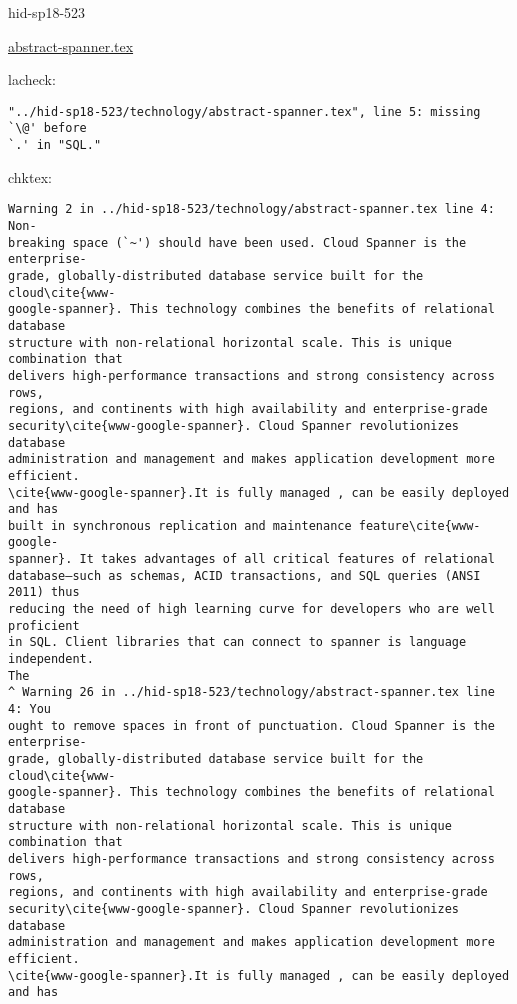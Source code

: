 \begin{IU}

hid-sp18-523

\href{https://github.com/cloudmesh-community/hid-sp18-523/blob/master//technology/abstract-spanner.tex}{abstract-spanner.tex}

 
lacheck:
\begin{tiny}
\begin{verbatim}
"../hid-sp18-523/technology/abstract-spanner.tex", line 5: missing `\@' before
`.' in "SQL."
\end{verbatim}
\end{tiny}
chktex:
\begin{tiny}
\begin{verbatim}
Warning 2 in ../hid-sp18-523/technology/abstract-spanner.tex line 4: Non-
breaking space (`~') should have been used. Cloud Spanner is the enterprise-
grade, globally-distributed database service built for the cloud\cite{www-
google-spanner}. This technology combines the benefits of relational database
structure with non-relational horizontal scale. This is unique combination that
delivers high-performance transactions and strong consistency across rows,
regions, and continents with high availability and enterprise-grade
security\cite{www-google-spanner}. Cloud Spanner revolutionizes database
administration and management and makes application development more efficient.
\cite{www-google-spanner}.It is fully managed , can be easily deployed and has
built in synchronous replication and maintenance feature\cite{www-google-
spanner}. It takes advantages of all critical features of relational
database—such as schemas, ACID transactions, and SQL queries (ANSI 2011) thus
reducing the need of high learning curve for developers who are well proficient
in SQL. Client libraries that can connect to spanner is language independent.
The
^ Warning 26 in ../hid-sp18-523/technology/abstract-spanner.tex line 4: You
ought to remove spaces in front of punctuation. Cloud Spanner is the enterprise-
grade, globally-distributed database service built for the cloud\cite{www-
google-spanner}. This technology combines the benefits of relational database
structure with non-relational horizontal scale. This is unique combination that
delivers high-performance transactions and strong consistency across rows,
regions, and continents with high availability and enterprise-grade
security\cite{www-google-spanner}. Cloud Spanner revolutionizes database
administration and management and makes application development more efficient.
\cite{www-google-spanner}.It is fully managed , can be easily deployed and has

\end{verbatim}
\end{tiny}
\end{IU}

